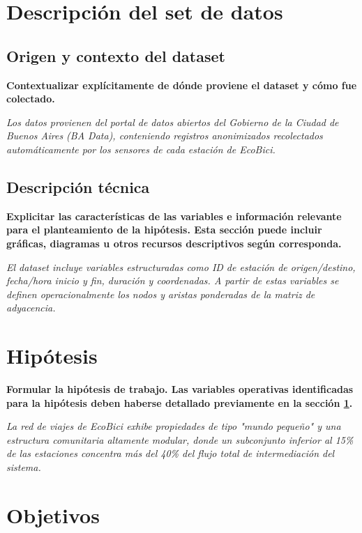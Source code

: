 \documentclass[12pt, a4paper]{article}
\begin{document}
\section{Descripción del set de datos}
\label{sec:dataset}

\subsection{Origen y contexto del dataset}
\textbf{Contextualizar explícitamente de dónde proviene el dataset y cómo fue colectado.}

\vspace{0.2cm}
\noindent \textit{Los datos provienen del portal de datos abiertos del Gobierno de la Ciudad de Buenos Aires (BA Data), conteniendo registros anonimizados recolectados automáticamente por los sensores de cada estación de EcoBici.}

\subsection{Descripción técnica}
\textbf{Explicitar las características de las variables e información relevante para el planteamiento de la hipótesis. Esta sección puede incluir gráficas, diagramas u otros recursos descriptivos según corresponda.}

\vspace{0.2cm}
\noindent \textit{El dataset incluye variables estructuradas como ID de estación de origen/destino, fecha/hora inicio y fin, duración y coordenadas. A partir de estas variables se definen operacionalmente los nodos y aristas ponderadas de la matriz de adyacencia.}

\section{Hipótesis}
\textbf{Formular la hipótesis de trabajo. Las variables operativas identificadas para la hipótesis deben haberse detallado previamente en la sección \ref{sec:dataset}.}

\vspace{0.2cm}
\noindent \textit{La red de viajes de EcoBici exhibe propiedades de tipo "mundo pequeño" y una estructura comunitaria altamente modular, donde un subconjunto inferior al 15\% de las estaciones concentra más del 40\% del flujo total de intermediación del sistema.}

\section{Objetivos}
\end{document}
